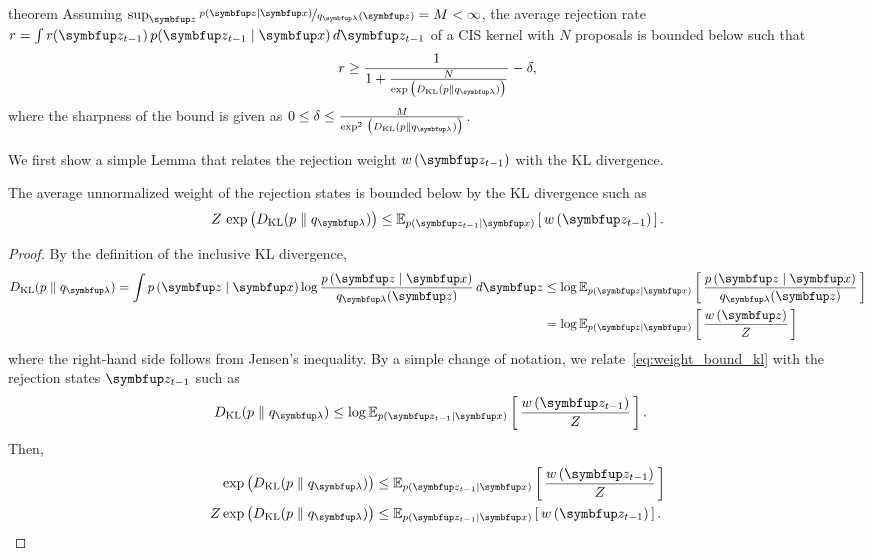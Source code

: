 
\begin{theoremEnd}[]{theorem}\label{thm:cis_bound_kl}
  Assuming \(\sup_{\vz} \nicefrac{p(\vz\mid\vx)}{q_{\vlambda}(\vz)} = M < \infty\), the average rejection rate \(r = \int r(\vz_{t-1}) \, p(\vz_{t-1}\mid\vx) \, d\vz_{t-1} \) of a CIS kernel with \(N\) proposals is bounded below such that
  \[
  r \geq \frac{1}{
    1 + \frac{N}{
      \exp\big(\DKL{p}{q_{\vlambda}}\big)
    }
    } - \delta,
  \]
  where the sharpness of the bound is given as \(
  0 \leq \delta \leq \frac{M}{\exp^2\,\big( \DKL{p}{q_{\vlambda}}\big) }
  \).
\end{theoremEnd}
\begin{proofEnd}
  We first show a simple Lemma that relates the rejection weight \(w\,(\vz_{t-1})\) with the KL divergence.
  \begin{framedlemma}\label{thm:rej_kl_bound}
    The average unnormalized weight of the rejection states is bounded below by the KL divergence such as
    \[
    Z\,\exp\big(\DKL{p}{q_{\vlambda}}\big) \leq \Esub{p(\vz_{t-1}\mid\vx)}{w\,(\vz_{t-1})}.
    \]
  \begin{proof}
    By the definition of the inclusive KL divergence,
    \begin{align}
      \DKL{p}{q_{\vlambda}} = \int p\,(\vz\mid\vx) \log \frac{p\,(\vz\mid\vx)}{q_{\vlambda}(\vz)} \, d\vz
      &\leq \log \Esub{p(\vz\mid\vx)}{\frac{p\,(\vz\mid\vx)}{q_{\vlambda}(\vz)}} \\
      &= \log \Esub{p(\vz\mid\vx)}{ \frac{w\,(\vz)}{Z} } \label{eq:weight_bound_kl}
    \end{align}
    where the right-hand side follows from Jensen's inequality.
    By a simple change of notation, we relate~\eqref{eq:weight_bound_kl} with the rejection states \(\vz_{t-1}\) such as
    \begin{align}
      \DKL{p}{q_{\vlambda}} &\leq \log \Esub{p(\vz_{t-1}\mid\vx)}{\frac{w\,(\vz_{t-1})}{Z}}.
    \end{align}
    Then,
    \begin{align}
      \exp\big(\DKL{p}{q_{\vlambda}}\big) &\leq \Esub{p(\vz_{t-1}\mid\vx)}{
        \frac{w\,(\vz_{t-1})}{Z}} \\
      Z \exp\big(\DKL{p}{q_{\vlambda}}\big) &\leq \Esub{p(\vz_{t-1}\mid\vx)}{w\,(\vz_{t-1})}.
    \end{align}
  \end{proof}
  \end{framedlemma}

\end{proofEnd}
